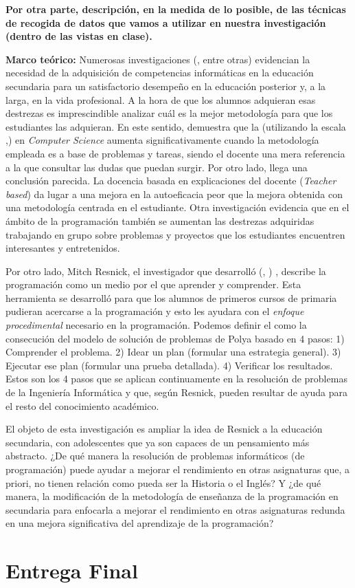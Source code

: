 \documentclass[palatino,nochap]{apuntesURJC}
\def\citeapos#1{\citetitle{#1} (\citeauthor{#1}, \citeyear{#1}) \cite{#1}}
\begin{document}
\textbf{
Por otra parte, descripción, en la medida de lo posible, de las técnicas de recogida de datos que vamos a utilizar en nuestra investigación (dentro de las vistas en clase).
}

\textbf{Marco teórico:}
Numerosas investigaciones (\cite{CSIsImportant},\cite{CSArguing} entre otras) evidencian la necesidad de la adquisición de competencias informáticas en la educación secundaria para un satisfactorio desempeño en la educación posterior y, a la larga, en la vida profesional.
%
A la hora de que los alumnos adquieran esas destrezas es imprescindible analizar cuál es la mejor metodología para que los estudiantes las adquieran.
%
En este sentido, \cite{StudentCenter} demuestra que la  (utilizando la escala ,\cite{CPSES}) en \textit{Computer Science} aumenta significativamente cuando la metodología empleada es a base de problemas y tareas, siendo el docente una mera referencia a la que consultar las dudas que puedan surgir.
%
Por otro lado, \cite{StudentCenterVSLectures} llega una conclusión parecida. 
%
La docencia basada en explicaciones del docente (\textit{Teacher based}) da lugar a una mejora en la autoeficacia peor que la mejora obtenida con una metodología centrada en el estudiante.
%
Otra investigación \cite{ABPCS} evidencia que en el ámbito de la programación también se aumentan las destrezas adquiridas trabajando en grupo sobre problemas y proyectos que los estudiantes encuentren interesantes y entretenidos. 


Por otro lado, Mitch Resnick, el investigador que desarrolló \citeapos{scratch}, describe la programación como un medio por el que aprender y comprender.
%
Esta herramienta se desarrolló para que los alumnos de primeros cursos de primaria pudieran acercarse a la programación y esto les ayudara con el \textit{enfoque procedimental} necesario en la programación.
%
Podemos definir el  como la consecución del modelo de solución de problemas de Polya \cite{Polya} basado en 4 pasos:
1) Comprender el problema. 2) Idear un plan (formular una estrategia general). 3) Ejecutar ese plan (formular una prueba detallada). 4) Verificar los resultados. 
%
Estos son los 4 pasos que se aplican continuamente en la resolución de problemas de la Ingeniería Informática y que, según Resnick, pueden resultar de ayuda para el resto del conocimiento académico.

El objeto de esta investigación es ampliar la idea de Resnick a la educación secundaria, con adolescentes que ya son capaces de un pensamiento más abstracto.
%
¿De qué manera la resolución de problemas informáticos (de programación) puede ayudar a mejorar el rendimiento en otras asignaturas que, a priori, no tienen relación como pueda ser la Historia o el Inglés?
%
Y ¿de qué manera, la modificación de la metodología de enseñanza de la programación en secundaria para enfocarla a mejorar el rendimiento en otras asignaturas redunda en una mejora significativa del aprendizaje de la programación?


\section{Entrega Final}




\printindex
\end{document}
